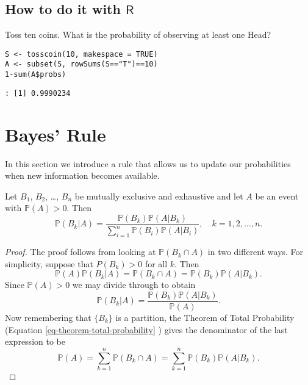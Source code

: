 \subsection{How to do it with \(\mathsf{R}\)}
\label{sec-4-7-1}


Toss ten coins. What is the probability of observing at least one
Head?

\begin{Verbatim}
S <- tosscoin(10, makespace = TRUE)
A <- subset(S, rowSums(S=="T")==10)
1-sum(A$probs)
\end{Verbatim}

\begin{verbatim}
: [1] 0.9990234
\end{verbatim}

\section{Bayes' Rule}
\label{sec-4-8}

In this section we introduce a rule that
allows us to update our probabilities when new information becomes
available.

\begin{thm}
Let \(B_{1}\), \(B_{2}\), \ldots{}, \(B_{n}\) be mutually exclusive and
exhaustive and let \(A\) be an event with \(\mathbb{P}(A)>0\). Then
\begin{equation}
\label{eq-bayes-rule}
\mathbb{P}(B_{k}|A)=\frac{\mathbb{P}(B_{k})\mathbb{P}(A|B_{k})}{\sum_{i=1}^{n}\mathbb{P}(B_{i})\mathbb{P}(A|B_{i})},\quad k=1,2,\ldots,n.
\end{equation}
\end{thm}

\begin{proof}
The proof follows from looking at \(\mathbb{P}(B_{k}\cap A)\) in two
different ways. For simplicity, suppose that \(P(B_{k})>0\) for all
\(k\). Then \[ \mathbb{P}(A)\mathbb{P}(B_{k}|A)=\mathbb{P}(B_{k}\cap
A)=\mathbb{P}(B_{k})\mathbb{P}(A|B_{k}).  \] Since \(\mathbb{P}(A)>0\)
we may divide through to obtain \[
\mathbb{P}(B_{k}|A)=\frac{\mathbb{P}(B_{k})\mathbb{P}(A|B_{k})}{\mathbb{P}(A)}.
\] Now remembering that \(\{ B_{k} \}\) is a partition, the Theorem of
Total Probability (Equation \eqref{eq-theorem-total-probability} )
gives the denominator of the last expression to be \[
\mathbb{P}(A)=\sum_{k=1}^{n}\mathbb{P}(B_{k}\cap
A)=\sum_{k=1}^{n}\mathbb{P}(B_{k})\mathbb{P}(A|B_{k}).  \]
\end{proof}

